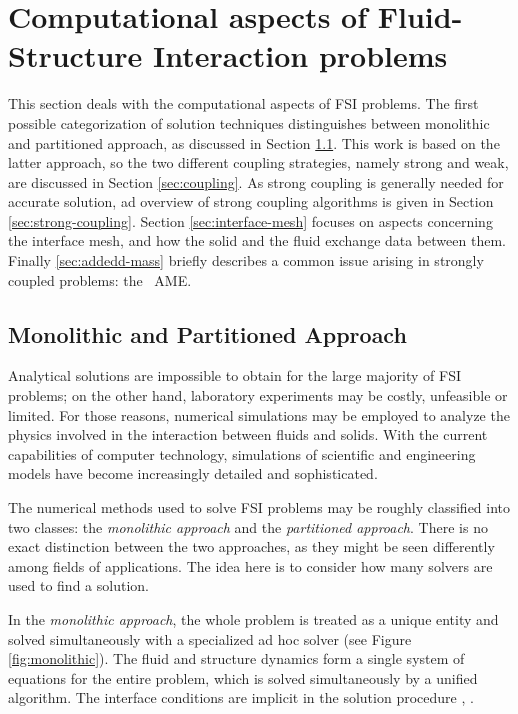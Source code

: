 \chapter{Computational aspects of Fluid-Structure Interaction problems}
\label{cha:computation}

This section deals with the computational aspects of FSI problems. The first possible categorization of solution techniques distinguishes between monolithic and partitioned approach, as discussed in Section \ref{sec:monolithic}. This work is based on the latter approach, so the two different coupling strategies, namely strong and weak, are discussed in Section \ref{sec:coupling}. As strong coupling is generally needed for accurate solution, ad overview of strong coupling algorithms is given in Section \ref{sec:strong-coupling}. Section \ref{sec:interface-mesh} focuses on aspects concerning the interface mesh, and how the solid and the fluid exchange data between them. Finally \ref{sec:addedd-mass} briefly describes a common issue arising in strongly coupled problems: the ~\ac{AME}.


\section{Monolithic and Partitioned Approach}
\label{sec:monolithic}

Analytical solutions are impossible to obtain for the large majority of FSI problems; on the other hand, laboratory experiments may be costly, unfeasible or limited. For those reasons, numerical simulations may be employed to analyze the physics involved in the interaction between fluids and solids. With the current capabilities of computer technology, simulations of scientific and engineering models have become increasingly detailed and sophisticated.

The numerical methods used to solve FSI problems may be roughly classified into two classes: the \textit{monolithic approach} and the \textit{partitioned approach}. There is no exact distinction between the two approaches, as they might be seen differently among fields of applications. The idea here is to consider how many solvers are used to find a solution.

In the \textit{monolithic approach}, the whole problem is treated as a unique entity and solved simultaneously with a specialized ad hoc solver (see Figure \ref{fig:monolithic}). The fluid and structure dynamics form a single system of equations for the entire problem, which is solved simultaneously by a unified algorithm. The interface conditions are implicit in the solution procedure \cite{hubner2004monolithic}, \cite{ryzhakov2010monolithic}.

